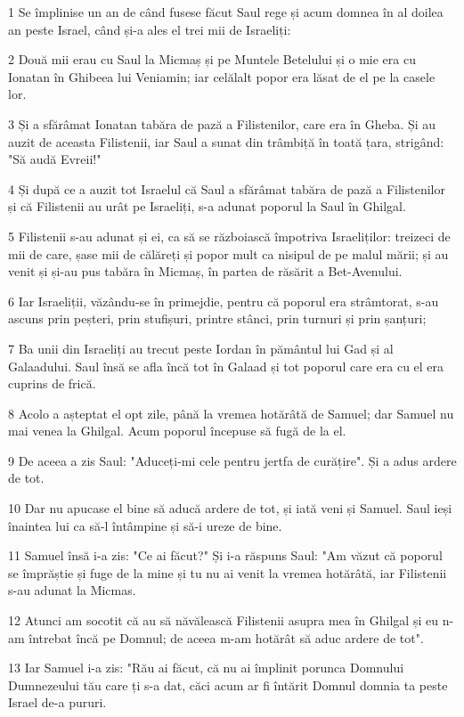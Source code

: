 \par 1 Se împlinise un an de când fusese făcut Saul rege și acum domnea în al doilea an peste Israel, când și-a ales el trei mii de Israeliți:
\par 2 Două mii erau cu Saul la Micmaș și pe Muntele Betelului și o mie era cu Ionatan în Ghibeea lui Veniamin; iar celălalt popor era lăsat de el pe la casele lor.
\par 3 Și a sfărâmat Ionatan tabăra de pază a Filistenilor, care era în Gheba. Și au auzit de aceasta Filistenii, iar Saul a sunat din trâmbiță în toată țara, strigând: "Să audă Evreii!"
\par 4 Și după ce a auzit tot Israelul că Saul a sfărâmat tabăra de pază a Filistenilor și că Filistenii au urât pe Israeliți, s-a adunat poporul la Saul în Ghilgal.
\par 5 Filistenii s-au adunat și ei, ca să se războiască împotriva Israeliților: treizeci de mii de care, șase mii de călăreți și popor mult ca nisipul de pe malul mării; și au venit și și-au pus tabăra în Micmaș, în partea de răsărit a Bet-Avenului.
\par 6 Iar Israeliții, văzându-se în primejdie, pentru că poporul era strâmtorat, s-au ascuns prin peșteri, prin stufișuri, printre stânci, prin turnuri și prin șanțuri;
\par 7 Ba unii din Israeliți au trecut peste Iordan în pământul lui Gad și al Galaadului. Saul însă se afla încă tot în Galaad și tot poporul care era cu el era cuprins de frică.
\par 8 Acolo a așteptat el opt zile, până la vremea hotărâtă de Samuel; dar Samuel nu mai venea la Ghilgal. Acum poporul începuse să fugă de la el.
\par 9 De aceea a zis Saul: "Aduceți-mi cele pentru jertfa de curățire". Și a adus ardere de tot.
\par 10 Dar nu apucase el bine să aducă ardere de tot, și iată veni și Samuel. Saul ieși înaintea lui ca să-l întâmpine și să-i ureze de bine.
\par 11 Samuel însă i-a zis: "Ce ai făcut?" Și i-a răspuns Saul: "Am văzut că poporul se împrăștie și fuge de la mine și tu nu ai venit la vremea hotărâtă, iar Filistenii s-au adunat la Micmas.
\par 12 Atunci am socotit că au să năvălească Filistenii asupra mea în Ghilgal și eu n-am întrebat încă pe Domnul; de aceea m-am hotărât să aduc ardere de tot".
\par 13 Iar Samuel i-a zis: "Rău ai făcut, că nu ai împlinit porunca Domnului Dumnezeului tău care ți s-a dat, căci acum ar fi întărit Domnul domnia ta peste Israel de-a pururi.
